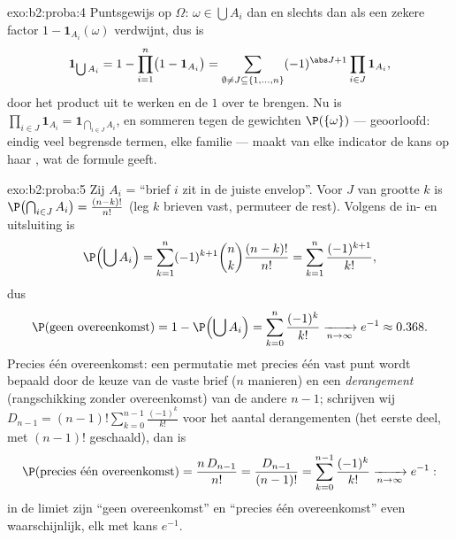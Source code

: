 \begin{solution}{exo:b2:proba:4}
Puntsgewijs op $\Omega$: $\omega \in \bigcup A_i$ dan en slechts
dan als een zekere factor $1 - \mathbf{1}_{A_i}(\omega)$ verdwijnt,
dus is
\[
\mathbf{1}_{\bigcup A_i}
= 1 - \prod_{i=1}^n\bigl(1 - \mathbf{1}_{A_i}\bigr)
= \sum_{\emptyset \neq J \subseteq \{1,\dots,n\}}
(-1)^{\abs J + 1}\prod_{i \in J}\mathbf{1}_{A_i} ,
\]
door het product uit te werken en de $1$ over te brengen. Nu is
$\prod_{i\in J}\mathbf{1}_{A_i} = \mathbf{1}_{\bigcap_{i \in J}
A_i}$, en sommeren tegen de gewichten $\P(\{\omega\})$ ---
geoorloofd: eindig veel begrensde termen, elke familie 
--- maakt van elke indicator de kans op haar , wat de
formule geeft.
\end{solution}

\begin{solution}{exo:b2:proba:5}
Zij $A_i$ = ``brief $i$ zit in de juiste envelop''. Voor $J$ van
grootte $k$ is $\P\bigl(\bigcap_{i\in J}A_i\bigr) =
\frac{(n-k)!}{n!}$ (leg $k$ brieven vast, permuteer de rest).
Volgens de in- en uitsluiting is
\[
\P\Bigl(\bigcup A_i\Bigr)
= \sum_{k=1}^n (-1)^{k+1}\binom nk \frac{(n-k)!}{n!}
= \sum_{k=1}^n \frac{(-1)^{k+1}}{k!} ,
\]
dus
\[
\P(\text{geen overeenkomst})
= 1 - \P\Bigl(\bigcup A_i\Bigr)
= \sum_{k=0}^{n}\frac{(-1)^k}{k!}
\xrightarrow[n\to\infty]{} e^{-1} \approx 0.368 .
\]
Precies één overeenkomst: een permutatie met precies één vast punt
wordt bepaald door de keuze van de vaste brief ($n$ manieren) en
een \emph{derangement} (rangschikking zonder overeenkomst) van de
andere $n - 1$; schrijven wij $D_{n-1} =
(n-1)!\sum_{k=0}^{n-1}\frac{(-1)^k}{k!}$ voor het aantal
derangementen (het eerste deel, met $(n-1)!$ geschaald), dan is
\[
\P(\text{precies één overeenkomst})
= \frac{n\,D_{n-1}}{n!}
= \frac{D_{n-1}}{(n-1)!}
= \sum_{k=0}^{n-1}\frac{(-1)^k}{k!}
\xrightarrow[n\to\infty]{} e^{-1} :
\]
in de limiet zijn ``geen overeenkomst'' en ``precies één
overeenkomst'' even waarschijnlijk, elk met kans $e^{-1}$.
\end{solution}

